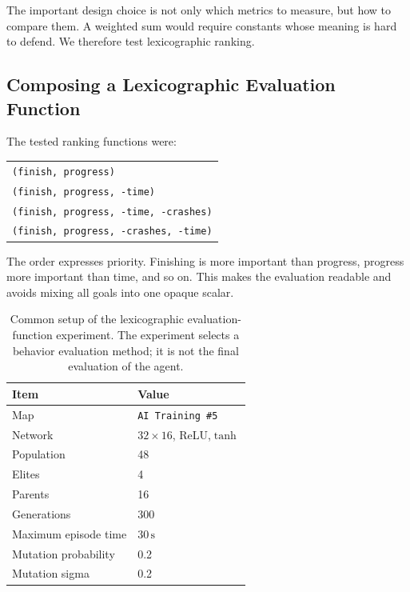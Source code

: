 The important design choice is not only which metrics to measure, but how to compare them. A weighted sum would require constants whose meaning is hard to defend. We therefore test lexicographic ranking.

\subsection{Composing a Lexicographic Evaluation Function}

The tested ranking functions were:
\begin{center}
\small
\begin{tabular}{l}
\texttt{(finish, progress)} \\
\texttt{(finish, progress, -time)} \\
\texttt{(finish, progress, -time, -crashes)} \\
\texttt{(finish, progress, -crashes, -time)}
\end{tabular}
\end{center}
The order expresses priority. Finishing is more important than progress, progress more important than time, and so on. This makes the evaluation readable and avoids mixing all goals into one opaque scalar.

\begin{table}[htbp]
    \centering
    \small
    \renewcommand{\arraystretch}{1.12}
    \caption[GA lexicographic comparison setup]{Common setup of the lexicographic evaluation-function experiment. The experiment selects a behavior evaluation method; it is not the final evaluation of the agent.}
    \label{tab:lex_reward_sweep_setup}
    \begin{tabular}{ll}
        \toprule
        Item & Value \\
        \midrule
        Map & \texttt{AI Training \#5} \\
        Network & \(32\times16\), ReLU,\(\tanh\) \\
        Population & 48 \\
        Elites & 4 \\
        Parents & 16 \\
        Generations & 300 \\
        Maximum episode time & \(30\,\mathrm{s}\) \\
        Mutation probability & 0.2 \\
        Mutation sigma & 0.2 \\
        \bottomrule
    \end{tabular}
\end{table}


